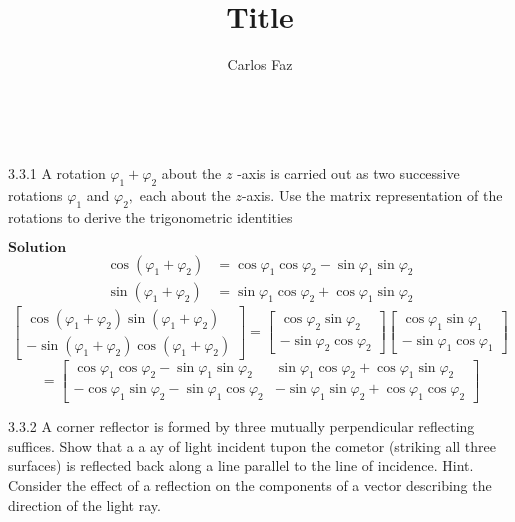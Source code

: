 \documentclass{article}
\title{Title}
\author{Carlos Faz}
\date{ \ }
\begin{document}
\maketitle

\begin{flushleft}

\begin{mybox}{3.3.1}
A rotation $\varphi_{1}+\varphi_{2}$ about the $z$ -axis is carried out as two successive rotations $\varphi_{1}$ and $\varphi_{2},$ each about the $z$-axis. Use the matrix representation of the rotations to derive the trigonometric identities
\end{mybox}
$\boxed{\textbf{Solution}}$
$$
\begin{aligned} \cos \left(\varphi_{1}+\varphi_{2}\right) &=\cos \varphi_{1} \cos \varphi_{2}-\sin \varphi_{1} \sin \varphi_{2} \\ \sin \left(\varphi_{1}+\varphi_{2}\right) &=\sin \varphi_{1} \cos \varphi_{2}+\cos \varphi_{1} \sin \varphi_{2} \end{aligned}
$$
$$\begin{bmatrix}{\cos \left(\varphi_{1}+\varphi_{2}\right) \sin \left(\varphi_{1}+\varphi_{2}\right)} \\ {-\sin \left(\varphi_{1}+\varphi_{2}\right) \cos \left(\varphi_{1}+\varphi_{2}\right)}\end{bmatrix}=\begin{bmatrix}{\cos \varphi_{2} \sin \varphi_{2}} \\ {-\sin \varphi_{2} \cos \varphi_{2}}\end{bmatrix}\begin{bmatrix}{\cos \varphi_{1} \sin \varphi_{1}} \\ {-\sin \varphi_{1} \cos \varphi_{1}}\end{bmatrix}$$
$$=\begin{bmatrix}{\cos \varphi_{1} \cos \varphi_{2}-\sin \varphi_{1} \sin \varphi_{2}} & {\sin \varphi_{1} \cos \varphi_{2}+\cos \varphi_{1} \sin \varphi_{2}} \\ {-\cos \varphi_{1} \sin \varphi_{2}-\sin \varphi_{1} \cos \varphi_{2}} & {-\sin \varphi_{1} \sin \varphi_{2}+\cos \varphi_{1} \cos \varphi_{2}}\end{bmatrix}$$



\begin{mybox}{3.3.2}
A corner reflector is formed by three mutually perpendicular reflecting suffices. Show that a a ay of light incident tupon the cometor (striking all three surfaces) is reflected back along a line parallel to the line of incidence. Hint. Consider the effect of a reflection on the components of a vector describing the direction of the light ray.
\end{mybox}


\end{flushleft}
\end{document}
